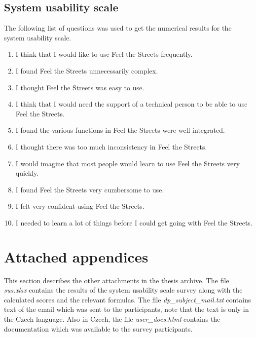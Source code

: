 \documentclass[nolof,digital]{fithesis3}
\begin{document}
\subsection{System usability scale}
The following list of questions was used to get the numerical results for the system usability scale.
\begin{enumerate}
\item I think that I would like to use Feel the Streets frequently.
\item I found Feel the Streets unnecessarily complex.
\item I thought Feel the Streets was easy to use.
\item I think that I would need the support of a technical person to be able to use Feel the Streets.
\item I found the various functions in Feel the Streets were well integrated.
\item I thought there was too much inconsistency in Feel the Streets.
\item I would imagine that most people would learn to use Feel the Streets very quickly.
\item I found Feel the Streets very cumbersome to use.
\item I felt very confident using Feel the Streets.
\item I needed to learn a lot of things before I could get going with Feel the Streets.
\end{enumerate}
\section{Attached appendices}
This section describes the other attachments in the thesis archive. The file \emph{sus.xlsx} contains the results of the system usability scale survey along with the calculated scores and the relevant formulas. The file \emph{dp\_subject\_mail.txt} contains text of the email which was sent to the participants, note that the text is only in the Czech language. Also in Czech, the file \emph{user\_docs.html} contains the documentation which was available to the survey participants.
\end{document}
